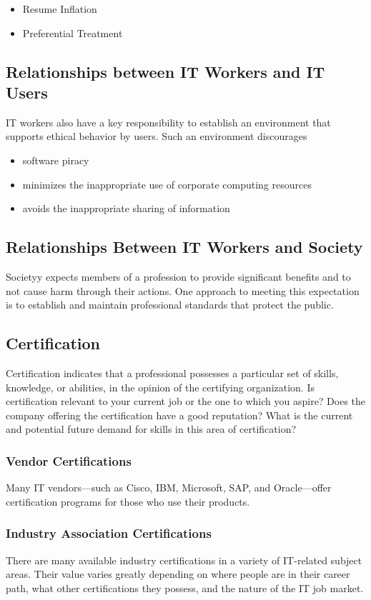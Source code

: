 \documentclass[11pt]{article}
\begin{document}
\begin{itemize}
\item Resume Inflation
\item Preferential Treatment
\end{itemize}
\subsection{Relationships between IT Workers and IT Users}
\label{sec:orgc73bcd1}
IT workers also have a key responsibility to establish an environment that supports ethical behavior by users. Such an environment discourages 
\begin{itemize}
\item software piracy
\item minimizes the inappropriate use of corporate computing resources
\item avoids the inappropriate sharing of information
\end{itemize}
\subsection{Relationships Between IT Workers and Society}
\label{sec:org411e681}
Societyy expects members of a profession to provide significant benefits and to not cause harm
through their actions. One approach to meeting this expectation is to establish and maintain professional standards that protect the public.
\subsection{Certification}
\label{sec:org685268f}
Certification indicates that a professional possesses a particular set of skills, knowledge, or abilities, in the opinion of the certifying organization.
Is certification relevant to your current job or the one to which you aspire? Does the company offering the certification have a good reputation? What is the current and potential future demand for skills in this area of certification?
\subsubsection{Vendor Certifications}
\label{sec:org7a15c74}
Many IT vendors—such as Cisco, IBM, Microsoft, SAP, and Oracle—offer certification programs for those who use their products.
\subsubsection{Industry Association Certifications}
\label{sec:org8ff85e0}
There are many available industry certifications in a variety of IT-related subject areas. Their value varies greatly depending on where people are in their career path, what other certifications they possess, and the nature of the IT job market.
\end{document}
